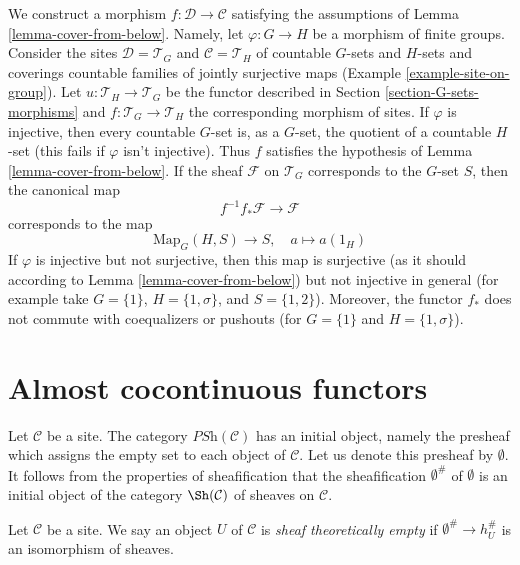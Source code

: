 \begin{example}
\label{example-cover-from-below}
We construct a morphism $f : \mathcal{D} \to \mathcal{C}$ satisfying
the assumptions of Lemma \ref{lemma-cover-from-below}. Namely, let
$\varphi : G \to H$ be a morphism of finite groups. Consider the sites
$\mathcal{D} = \mathcal{T}_G$ and $\mathcal{C} = \mathcal{T}_H$ of countable
$G$-sets and $H$-sets and coverings countable families of jointly
surjective maps (Example \ref{example-site-on-group}).
Let $u : \mathcal{T}_H \to \mathcal{T}_G$ be the functor described
in Section \ref{section-G-sets-morphisms}
and $f : \mathcal{T}_G \to \mathcal{T}_H$ the
corresponding morphism of sites. If $\varphi$ is injective, then
every countable $G$-set is, as a $G$-set, the quotient of a countable
$H$-set (this fails if $\varphi$ isn't injective). Thus $f$ satisfies
the hypothesis of Lemma \ref{lemma-cover-from-below}.
If the sheaf $\mathcal{F}$ on $\mathcal{T}_G$ corresponds to the $G$-set
$S$, then the canonical map
$$
f^{-1}f_*\mathcal{F} \longrightarrow \mathcal{F}
$$
corresponds to the map
$$
\text{Map}_G(H, S) \longrightarrow S,\quad
a \longmapsto a(1_H)
$$
If $\varphi$ is injective but not surjective, then this map is surjective
(as it should according to Lemma \ref{lemma-cover-from-below})
but not injective in general
(for example take $G = \{1\}$, $H = \{1, \sigma\}$, and $S = \{1, 2\}$).
Moreover, the functor $f_*$ does not commute with coequalizers or
pushouts (for $G = \{1\}$ and $H = \{1, \sigma\}$).
\end{example}





\section{Almost cocontinuous functors}
\label{section-almost-cocontinuous}

\noindent
Let $\mathcal{C}$ be a site. The category $\textit{PSh}(\mathcal{C})$ has
an initial object, namely the presheaf which assigns the empty set
to each object of $\mathcal{C}$. Let us denote this presheaf by
$\emptyset$. It follows from the properties of sheafification that the
sheafification $\emptyset^\#$ of $\emptyset$ is an initial object
of the category $\Sh(\mathcal{C})$ of sheaves on $\mathcal{C}$.

\begin{definition}
\label{definition-empty}
Let $\mathcal{C}$ be a site. We say an object $U$ of $\mathcal{C}$
is {\it sheaf theoretically empty} if $\emptyset^\# \to h_U^\#$
is an isomorphism of sheaves.
\end{definition}

